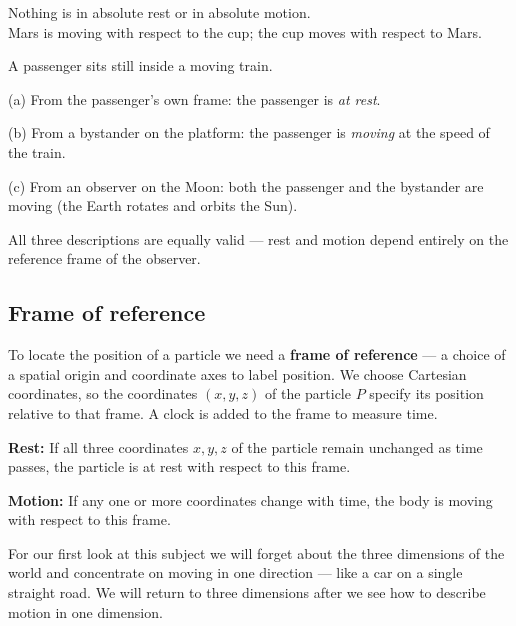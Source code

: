 \begin{keybox}
\centering
Nothing is in absolute rest or in absolute motion.\\
Mars is moving with respect to the cup; the cup moves with respect to Mars.
\end{keybox}

\begin{workedexample}
A passenger sits still inside a moving train.

(a) From the passenger's own frame: the passenger is \emph{at rest}.

(b) From a bystander on the platform: the passenger is \emph{moving} at the speed of the train.

(c) From an observer on the Moon: both the passenger and the bystander are moving (the
Earth rotates and orbits the Sun).

All three descriptions are equally valid --- rest and motion depend entirely on the reference
frame of the observer.
\end{workedexample}

\subsection{Frame of reference}

To locate the position of a particle we need a \textbf{frame of reference} --- a choice of a
spatial origin and coordinate axes to label position. We choose Cartesian coordinates, so the
coordinates $(x,y,z)$ of the particle $P$ specify its position relative to that frame. A clock is
added to the frame to measure time.

\begin{keybox}
\textbf{Rest:} If all three coordinates $x,y,z$ of the particle remain unchanged as time passes,
the particle is at rest with respect to this frame.

\textbf{Motion:} If any one or more coordinates change with time, the body is moving with
respect to this frame.
\end{keybox}

\begin{keybox}
For our first look at this subject we will forget about the three dimensions of the world
and concentrate on moving in one direction --- like a car on a single straight road. We
will return to three dimensions after we see how to describe motion in one dimension.
\end{keybox}


